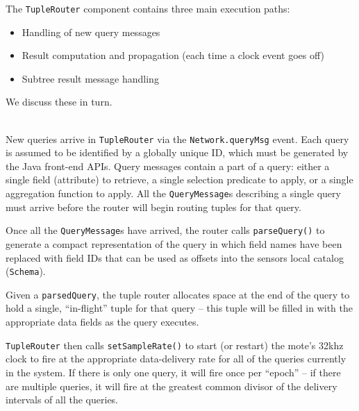 \documentclass[11pt]{article}
\begin{document}
The {\tt TupleRouter} component contains three main execution
paths:
\begin{itemize}
\item Handling of new query messages
\item Result computation and propagation (each time a clock event goes off)
\item Subtree result message handling
\end{itemize}
We discuss these in turn.

\vspace{1em}
\\
New queries arrive in {\tt TupleRouter} via the {\tt Network.queryMsg} event.  Each query
  is assumed to be identified by a globally unique ID, which must be
  generated by the Java front-end APIs.  Query
  messages contain a part of a query: either a single field (attribute) to
  retrieve, a single selection predicate to apply, or a single
  aggregation function to apply.  All the {\tt QueryMessage}s describing a
  single query must arrive before the router will begin routing tuples
  for that query.

Once all the {\tt QueryMessage}s have arrived, the router calls
  {\tt parseQuery()} to generate a compact representation of the query in
  which field names have been replaced with field IDs that can be used
  as offsets into the sensors local catalog ({\tt Schema}).
  
Given a {\tt parsedQuery}, the tuple router allocates space at the end
  of the query to hold a single, ``in-flight'' tuple for that query --
  this tuple will be filled in with the appropriate data fields as the
  query executes.
  
{\tt TupleRouter} then calls {\tt setSampleRate()} to start (or restart) the
  mote's 32khz clock to fire at the appropriate data-delivery rate for
  all of the queries currently in the system.  If there is only one
  query, it will fire once per ``epoch'' -- if there are multiple queries,
  it will fire at the greatest common divisor of the delivery intervals of all the queries.
\end{document}

